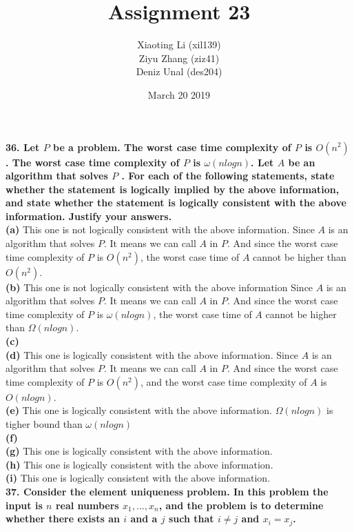 \documentclass{article}
\title{Assignment 23}
\author{Xiaoting Li (xil139) \\
Ziyu Zhang (ziz41) \\
Deniz Unal (des204)}
\date{March 20 2019}
\begin{document}
\maketitle

\noindent
\textbf{36. Let $P$ be a problem. The worst case time complexity of $P$ is $O(n^2)$. The worst case time complexity of $P$ is $\omega(nlogn)$. Let $A$ be an algorithm that solves $P$ . For each of the following statements, state whether the statement is logically implied by the above information, and state whether the statement is logically consistent with the above information. Justify your answers.} \\ \newline
\textbf{(a)} This one is not logically consistent with the above information. Since $A$ is an algorithm that solves $P$. It means we can call $A$ in $P$. And since the worst case time complexity of $P$ is $O(n^2)$, the worst case time of $A$ cannot be higher than $O(n^2)$.\\ \newline
\textbf{(b)} This one is not logically consistent with the above information Since $A$ is an algorithm that solves $P$. It means we can call $A$ in $P$. And since the worst case time complexity of $P$ is $\omega(nlogn)$, the worst case time of $A$ cannot be higher than $\Omega(nlogn)$. \\ \newline
\textbf{(c)} \\ \newline
\textbf{(d)} This one is logically consistent with the above information. Since $A$ is an algorithm that solves $P$. It means we can call $A$ in $P$. And since the worst case time complexity of $P$ is $O(n^2)$, and the worst case time complexity of $A$ is $O(nlogn)$.\\ \newline
\textbf{(e)} This one is logically consistent with the above information. $\Omega(nlogn)$ is tigher bound than $\omega(nlogn)$\\ \newline
\textbf{(f)} \\ \newline
\textbf{(g)} This one is logically consistent with the above information.\\ \newline
\textbf{(h)} This one is logically consistent with the above information.\\ \newline
\textbf{(i)} This one is logically consistent with the above information.\\ \newline
\textbf{37. Consider the element uniqueness problem. In this problem the input is $n$ real numbers $x_1,..., x_n$, and the problem is to determine whether there exists an $i$ and a $j$ such that $i\neq j$ and $x_i = x_j$.}
\end{document}
